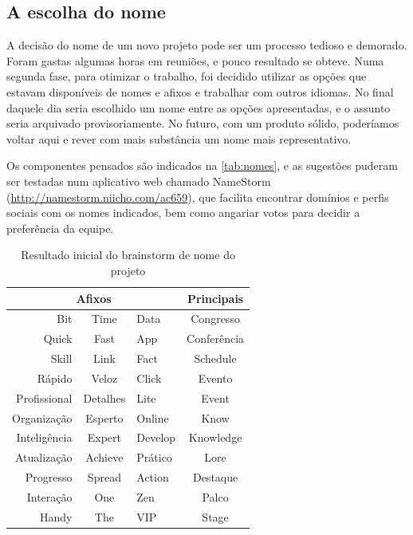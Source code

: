 \documentclass[12pt,a4paper,twoside,hyphens,english,brazil]{abntex2}
\begin{document}


\subsection{A escolha do nome}

A decisão do nome de um novo projeto pode ser um processo tedioso e demorado. Foram gastas algumas horas em reuniões, e pouco resultado se obteve. Numa segunda fase, para otimizar o trabalho, foi decidido utilizar as opções que estavam disponíveis de nomes e afixos e trabalhar com outros idiomas. No final daquele dia seria escolhido um nome entre as opções apresentadas, e o assunto seria arquivado provisoriamente. No futuro, com um produto sólido, poderíamos voltar aqui e rever com mais substância um nome mais representativo.

Os componentes pensados são indicados na \autoref{tab:nomes}, e as sugestões puderam ser testadas num aplicativo web chamado NameStorm (\url{http://namestorm.niicho.com/ac659}), que facilita encontrar domínios e perfis sociais com os nomes indicados, bem como angariar votos para decidir a preferência da equipe.\\

\begin{table}[h]
	\caption{Resultado inicial do brainstorm de nome do projeto}
	\centering
	\begin{tabular}{rcl|c}
		\multicolumn{3}{c|}{\textbf{Afixos}}& \textbf{Principais} \\\hline
		Bit			& Time		& Data		& Congresso		 \\\cline{1-3}
		Quick		& Fast		& App		& Conferência	 \\\cline{1-3}
		Skill		& Link		& Fact		& Schedule		 \\\cline{1-3}
		Rápido		& Veloz		& Click 	& Evento		 \\\cline{1-3}
		Profissional& Detalhes	& Lite		& Event			 \\\cline{1-3}
		Organização	& Esperto	& Online	& Know			 \\\cline{1-3}
		Inteligência& Expert	& Develop	& Knowledge		 \\\cline{1-3}
		Atualização	& Achieve	& Prático	& Lore			 \\\cline{1-3}
		Progresso	& Spread	& Action	& Destaque		 \\\cline{1-3}
		Interação	& One		& Zen		& Palco			 \\\cline{1-3}
		Handy		& The		& VIP		& Stage			
	\end{tabular}
	\label{tab:nomes}
\end{table}
\end{document}
